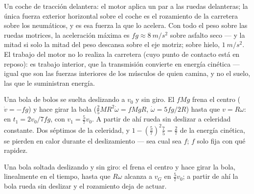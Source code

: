 \begin{example}\label{ex:b2:rigid-body-mechanics:car}
Un coche de tracción delantera: el motor aplica un par a las ruedas
delanteras; la única fuerza exterior horizontal sobre el coche es el
rozamiento de la carretera sobre los neumáticos, y es esa fuerza la que
lo acelera. Con todo el peso sobre las ruedas motrices, la aceleración
máxima es $fg \approx \qty{8}{m/s^2}$ sobre asfalto seco --- y la mitad si
solo la mitad del peso descansa sobre el eje motriz; sobre hielo,
$\qty{1}{m/s^2}$. El trabajo del motor no lo realiza la carretera (cuyo
punto de contacto está en reposo): es trabajo interior, que la transmisión
convierte en energía cinética --- igual que son las fuerzas interiores de
los músculos de quien camina, y no el suelo, las que le suministran energía.
\end{example}

\begin{example}\label{ex:b2:rigid-body-mechanics:bowling}
Una bola de bolos se suelta deslizando a $v_0$ y sin giro. El  $fMg$ frena el centro ($\dot v = -fg$) y hace girar la bola
($\tfrac25MR^2\dot\omega = fMgR$, $\dot\omega = 5fg/2R$) hasta que $v = R\omega$:
en $t_1 = 2v_0/7fg$, con $v_1 = \tfrac57v_0$. A partir de ahí rueda sin
deslizar a celeridad constante. Dos séptimos de la celeridad, y
$1 - (\tfrac57)^2\tfrac75 = \tfrac27$ de la energía cinética, se pierden en
calor durante el deslizamiento --- sea cual sea $f$; $f$ solo fija con qué rapidez.
\end{example}

\begin{omfigure}

{\small Una bola soltada deslizando y sin giro: el 
frena el centro y hace girar la bola, linealmente en el tiempo, hasta que
$R\omega$ alcanza a $v_G$ en $\tfrac57v_0$; a partir de ahí la bola rueda
sin deslizar y el rozamiento deja de actuar.}
\end{omfigure}

